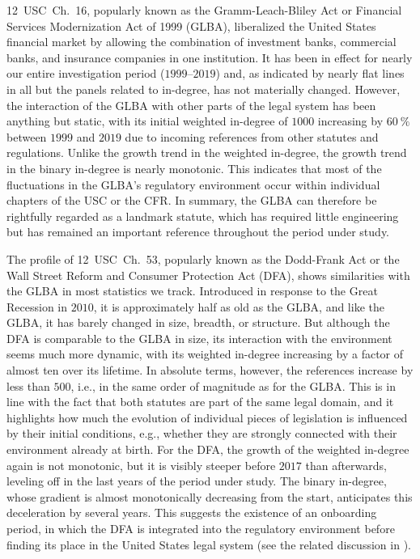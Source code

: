 12~USC~Ch.~16, popularly known as the Gramm-Leach-Bliley Act or Financial Services Modernization Act of 1999 (GLBA), liberalized the United States financial market by allowing the combination of investment banks, commercial banks, and insurance companies in one institution. 
It has been in effect for nearly our entire investigation period ($1999$--$2019$) and, as indicated by nearly flat lines in all but the panels related to in-degree, has not materially changed.
However, the interaction of the GLBA with other parts of the legal system has been anything but static, with its initial weighted in-degree of $1000$ increasing by $60~\%$ between $1999$ and $2019$ due to incoming references from other statutes and regulations.
Unlike the growth trend in the weighted in-degree, the growth trend in the binary in-degree is nearly monotonic. 
This indicates that most of the fluctuations in the GLBA's regulatory environment occur within individual chapters of the USC or the CFR.
In summary, the GLBA can therefore be rightfully regarded as a landmark statute, which has required little engineering but has remained an important reference throughout the period under study.

The profile of 12~USC~Ch.~53, popularly known as the Dodd-Frank Act or the Wall Street Reform and Consumer Protection Act (DFA), shows similarities with the GLBA in most statistics we track.
Introduced in response to the Great Recession in $2010$, 
it is approximately half as old as the GLBA, 
and like the GLBA, it has barely changed in size, breadth, or structure.
But although the DFA is comparable to the GLBA in size, 
its interaction with the environment seems much more dynamic, 
with its weighted in-degree increasing by a factor of almost ten over its lifetime.
In absolute terms, however, the references increase by less than $500$, i.e., in the same order of magnitude as for the GLBA.
This is in line with the fact that both statutes are part of the same legal domain, and it highlights how much the evolution of individual pieces of legislation is influenced by their initial conditions, e.g., whether they are strongly connected with their environment already at birth.
For the DFA, the growth of the weighted in-degree again is not monotonic, 
but it is visibly steeper before $2017$ than afterwards, leveling off in the last years of the period under study.
The binary in-degree, whose gradient is almost monotonically decreasing from the start, anticipates this deceleration by several years.
This suggests the existence of an onboarding period, in which the DFA is integrated into the regulatory environment before finding its place in the United States legal system (see the related discussion in \cite{mclaughlin2021}).

